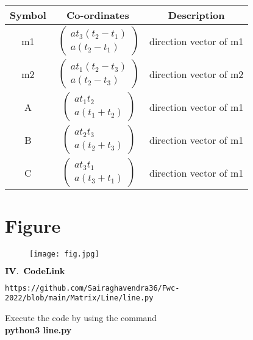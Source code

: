 \documentclass[journal,12pt,twocolumn]{IEEEtran}
\let\vec\mathbf
\begin{document}
\pagebreak\begin{tabular}{|c |c |c|}
    \hline %
      \large\textbf{ Symbol } & \large\textbf{ Co-ordinates } & \large\textbf{Description}\\
      \hline
       \large m1 & $\ \begin{pmatrix} at_3(t_2-t_1)\\ a(t_2-t_1) \end{pmatrix}$ & direction vector of m1 \\
       
       \large m2 & $\ \begin{pmatrix} at_1(t_2-t_3)\\ a(t_2-t_3) \end{pmatrix}$ & direction vector of m2 \\
       
		 \large A & $\ \begin{pmatrix} at_1t_2\\ a(t_1+t_2) \end{pmatrix}$ & direction vector of m1 \\  
		 
		 \large B & $\ \begin{pmatrix} at_2t_3\\ a(t_2+t_3) \end{pmatrix}$ & direction vector of m1 \\  
		 
		 \large C & $\ \begin{pmatrix} at_3t_1\\ a(t_3+t_1) \end{pmatrix}$ & direction vector of m1 \\  
  
      \hline
   \end{tabular}




\section{\textbf{Figure}}
\begin{figure}[h]
    \centering
\texttt{[image: fig.jpg]}
    \label{fig:my_label}
\end{figure}


\begin{center}
$\vec{IV.\hspace{.2cm} Code Link}$
\end{center}
\begin{lstlisting}
https://github.com/Sairaghavendra36/Fwc-2022/blob/main/Matrix/Line/line.py
\end{lstlisting}
Execute the code by using the command\\
\textbf{python3 line.py}
\end{document}
